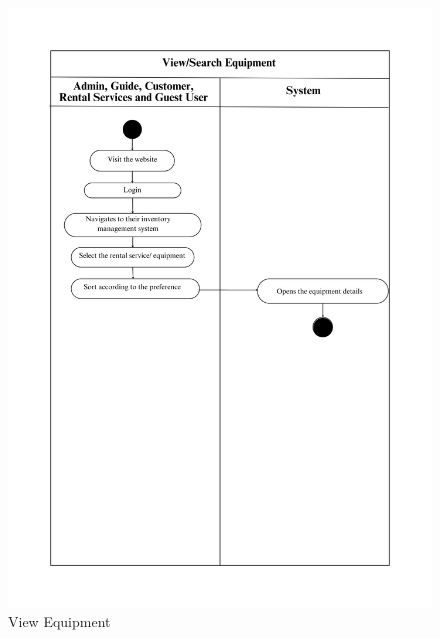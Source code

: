 \begin{figure}[h]
    \centering
    \includegraphics[width=1\textwidth]{Images/Activity Diagrams/20 View_Search Equipment.png}
    \caption{View Equipment}
    \label{fig:activity-view-equ}
\end{figure}

